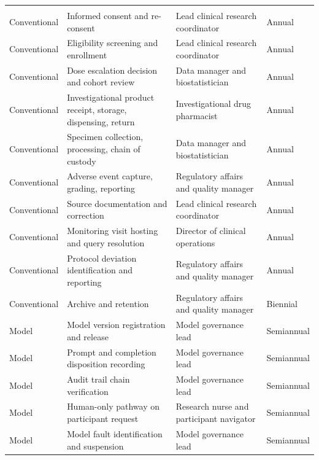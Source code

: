 \begin{mvltable}
\begin{xltabular}{\textwidth}{>{\raggedright\arraybackslash}p{2.1cm} >{\raggedright\arraybackslash}p{4.3cm} >{\raggedright\arraybackslash}p{2.9cm} >{\raggedright\arraybackslash}X}
\headrow {} &  &  & \\
\midrule
\endfirsthead
\headrow {} &  &  & \\
\midrule
\endhead
Conventional & Informed consent and re-consent & Lead clinical research coordinator & Annual \\
Conventional & Eligibility screening and enrollment & Lead clinical research coordinator & Annual \\
Conventional & Dose escalation decision and cohort review & Data manager and biostatistician & Annual \\
Conventional & Investigational product receipt, storage, dispensing, return & Investigational drug pharmacist & Annual \\
Conventional & Specimen collection, processing, chain of custody & Data manager and biostatistician & Annual \\
Conventional & Adverse event capture, grading, reporting & Regulatory affairs and quality manager & Annual \\
Conventional & Source documentation and correction & Lead clinical research coordinator & Annual \\
Conventional & Monitoring visit hosting and query resolution & Director of clinical operations & Annual \\
Conventional & Protocol deviation identification and reporting & Regulatory affairs and quality manager & Annual \\
Conventional & Archive and retention & Regulatory affairs and quality manager & Biennial \\
Model & Model version registration and release & Model governance lead & Semiannual \\
Model & Prompt and completion disposition recording & Model governance lead & Semiannual \\
Model & Audit trail chain verification & Model governance lead & Semiannual \\
Model & Human-only pathway on participant request & Research nurse and participant navigator & Semiannual \\
Model & Model fault identification and suspension & Model governance lead & Semiannual \\

\end{xltabular}
\end{mvltable}
